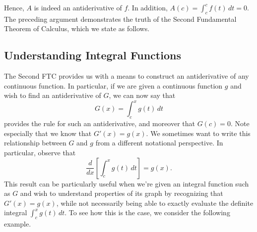 
Hence, $A$ is indeed an antiderivative of $f$.  In addition, $A(c) = \int_c^c f(t) \, dt = 0.$  The preceding argument demonstrates the truth of the Second Fundamental Theorem of Calculus, which we state as follows.

 \vspace*{5pt}
\nin {}
\vspace*{1pt}



\subsection*{Understanding Integral Functions}%

The Second FTC provides us with a means to construct an antiderivative of any continuous function.  In particular, if we are given a continuous function $g$ and wish to find an antiderivative of $G$, we can now say that 
$$G(x) = \int_c^x g(t) \, dt$$
provides the rule for such an antiderivative, and moreover that $G(c) = 0$.  Note especially that we know that $G'(x) = g(x)$.  We sometimes want to write this relationship between $G$ and $g$ from a different notational perspective.  In particular, observe that
\begin{equation} \label{E:diffint}
\frac{d}{dx} \left[ \int_c^x g(t) \, dt \right] = g(x).
\end{equation}
This result can be particularly useful when we're given an integral function such as $G$ and wish to understand properties of its graph by recognizing that $G'(x) = g(x)$, while not necessarily being able to exactly evaluate the definite integral $\int_c^x g(t) \, dt$.  To see how this is the case, we consider the following example.

